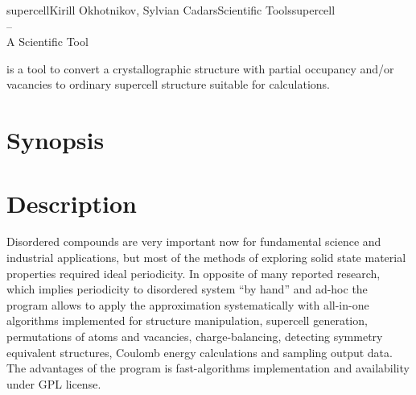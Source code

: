 \documentclass[a4paper,english]{article}
\begin{document}
\newcommand{\Dd}{-{}-}

\begin{Name}{1}{supercell}{Kirill Okhotnikov, Sylvian Cadars}{Scientific Tools}{supercell\\--\\ A Scientific Tool}

   is a tool to convert a crystallographic structure with partial occupancy and/or vacancies to  ordinary supercell structure suitable for calculations.
\end{Name}

\section{Synopsis}

\begin{Description}\setlength{\itemsep}{0cm}
\item[]
 \Opt{-h, \Dd help}
\item[]
   
\item[]
  \OptArg{\Dd input=}{input-file}

\end{Description}

\section{Description}
Disordered compounds are very important now for fundamental science and industrial applications, but most of the methods of exploring solid state material properties required ideal periodicity. In opposite of many reported research, which implies periodicity to disordered system ``by hand'' and ad-hoc the program  allows to apply the approximation systematically with all-in-one algorithms implemented for structure manipulation, supercell generation, permutations of atoms and vacancies, charge-balancing, detecting symmetry equivalent structures, Coulomb energy calculations and sampling output data. The advantages of the program is fast-algorithms implementation and availability under GPL license. 
\end{document}
